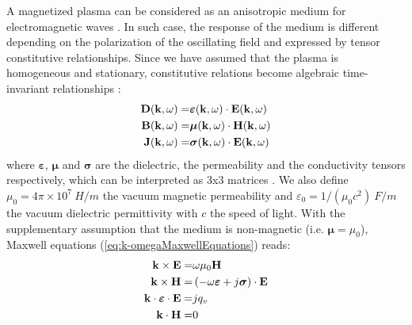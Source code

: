 A magnetized plasma can be considered as an anisotropic medium for electromagnetic waves . In such case, the response of the medium is different depending on the polarization of the oscillating field and expressed by tensor constitutive relationships. Since we have assumed that the plasma is homogeneous and stationary, constitutive relations become algebraic time-invariant relationships :
\begin{subequations}
	\begin{align}
		{\mathbf D}({\mathbf k}, \omega) 
		=& 
		\boldsymbol{\varepsilon}({\mathbf k}, \omega) \cdot {\mathbf E}({\mathbf k}, \omega) 
		\label{eq:disp_relation_kw_D}
		\\
		{\mathbf B}({\mathbf k}, \omega) 
		=& 
		\boldsymbol{\mu}({\mathbf k}, \omega) \cdot {\mathbf H}({\mathbf k}, \omega) 
		\label{eq:disp_relation_kw_B}
		\\
		{\mathbf J}({\mathbf k}, \omega) 
		=& 
		\boldsymbol{\sigma}({\mathbf k}, \omega) \cdot {\mathbf E}({\mathbf k}, \omega) 
		\label{eq:disp_relation_kw_J}
	\end{align}
	\label{eq:k-omegaDispersionRelation}
\end{subequations}%
where $\boldsymbol{\varepsilon}$, $\boldsymbol{\mu}$ and $\boldsymbol{\sigma}$ are the dielectric, the permeability and the conductivity tensors respectively, which can be interpreted as 3x3 matrices . We also define $\mu_0=4\pi\times10^7~\si{H/m}$ the vacuum magnetic permeability and $\varepsilon_0=1/(\mu_0 c^2)~\si{F/m}$ the vacuum dielectric permittivity with $c$ the speed of light. With the supplementary assumption that the medium is non-magnetic (i.e. $\boldsymbol{\mu}=\mu_0$), Maxwell equations (\ref{eq:k-omegaMaxwellEquations}) reads:
\begin{subequations}
	\begin{align}
		{\mathbf k} \times {\mathbf E}  
		=& 
		\omega \mu_0 {\mathbf H}
		\\
		{\mathbf k} \times {\mathbf H} 
		=& 
		\left(
		-\omega \boldsymbol{\varepsilon} 
		+ 	
		j\boldsymbol{\sigma} 
		\right) \cdot 
		{\mathbf E}
		\\
		{\mathbf k}  \cdot \boldsymbol{\varepsilon}  \cdot {\mathbf E} 
		=& jq_v
		\\
		{\mathbf k}  \cdot {\mathbf H} 
		=& 0	
	\end{align}
	\label{eq:maxwell_equations_kspace}
\end{subequations}

